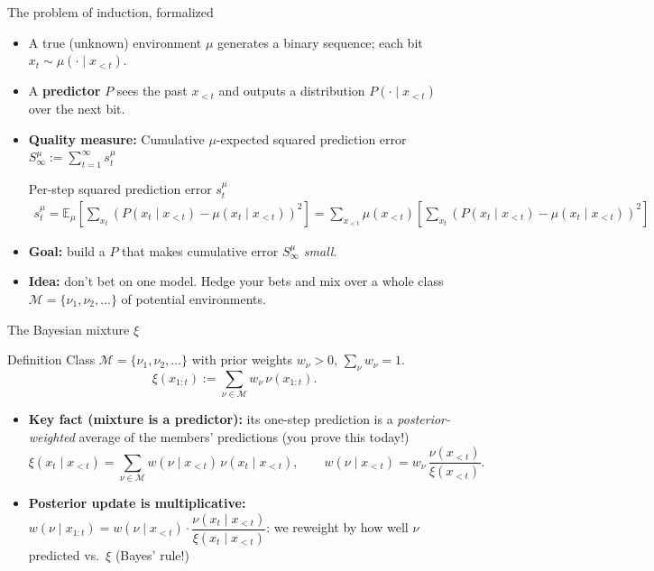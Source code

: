 \documentclass[10pt,aspectratio=169]{beamer}
\newcommand{\cM}{\mathcal{M}}
\begin{document}
\begin{frame}{The problem of induction, formalized}
\begin{itemize}
    \item A true (unknown) environment $\mu$ generates a binary sequence; each bit
    $x_t \sim \mu(\cdot \mid x_{<t})$.
    \pause
    \item A \textbf{predictor} $P$ sees the past $x_{<t}$ and outputs a distribution
    $P(\cdot \mid x_{<t})$ over the next bit.
    \pause
    \item \textbf{Quality measure:} Cumulative $\mu$-expected squared prediction error $S_\infty^\mu := \sum_{t=1}^{\infty} s_t^\mu$
    \begin{block}{Per-step squared prediction error $s_t^\mu$}
        \begin{align*}
    s_t^\mu = \mathbb{E}_\mu \left[ \sum_{x_t} \left( P(x_t \mid x_{<t}) - \mu(x_t \mid x_{<t}) \right)^2 \right] 
     = \sum_{x_{<t}} \mu(x_{<t}) \left[ \sum_{x_t} \left( P(x_t \mid x_{<t}) - \mu(x_t \mid x_{<t}) \right)^2 \right]
    \end{align*}
    \end{block}
    \pause
    \item \textbf{Goal:} build a $P$ that makes cumulative error $S_\infty^\mu$ \emph{small}.
    \pause
    \item \textbf{Idea:} don't bet on one model. Hedge your bets and mix 
    over a whole class $\cM=\{\nu_1,\nu_2,\dots\}$ of potential environments.
\end{itemize}
\end{frame}

\begin{frame}{The Bayesian mixture $\xi$}
\begin{block}{Definition}
Class $\cM=\{\nu_1,\nu_2,\dots\}$ with prior weights $w_\nu>0$, $\sum_\nu w_\nu = 1$.
\[
\xi(x_{1:t}) := \sum_{\nu \in \cM} w_\nu\, \nu(x_{1:t}).
\]
\end{block}
\pause
\begin{itemize}
    \item \textbf{Key fact (mixture is a predictor):} its one-step prediction is a
    \emph{posterior-weighted} average of the members' predictions (you prove this today!)
    \[
    \xi(x_t \mid x_{<t}) = \sum_{\nu \in \cM} w(\nu \mid x_{<t})\, \nu(x_t \mid x_{<t}),
    \qquad
    w(\nu \mid x_{<t}) = w_\nu\,\frac{\nu(x_{<t})}{\xi(x_{<t})}.
    \]
    \pause
    \item \textbf{Posterior update is multiplicative:}
    $w(\nu \mid x_{1:t}) = w(\nu\mid x_{<t})\cdot \dfrac{\nu(x_t\mid x_{<t})}{\xi(x_t\mid x_{<t})}$: we
    reweight by how well $\nu$ predicted vs.\ $\xi$ (Bayes' rule!)
\end{itemize}
\end{frame}
\end{document}
